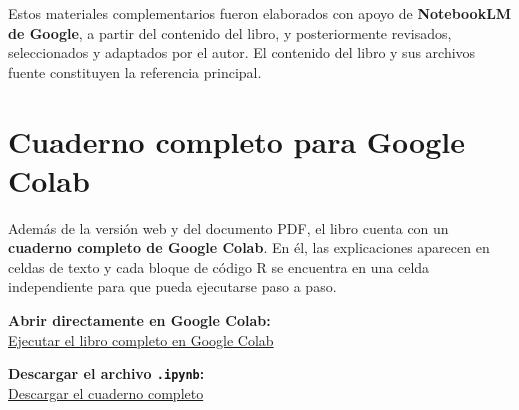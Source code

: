 \documentclass[
  spanish,
  10.5pt,
  letterpaper,
  openany,
  headings=big]{scrbook}
\begin{document}
\begin{tcolorbox}[enhanced jigsaw, arc=.35mm, bottomrule=.15mm, bottomtitle=1mm, breakable, colback=white, colbacktitle=quarto-callout-note-color!10!white, colframe=quarto-callout-note-color-frame, coltitle=black, left=2mm, leftrule=.75mm, opacityback=0, opacitybacktitle=0.6, rightrule=.15mm, title=\textcolor{quarto-callout-note-color}{\faInfo}\hspace{0.5em}{Elaboración de los recursos}, titlerule=0mm, toprule=.15mm, toptitle=1mm]

Estos materiales complementarios fueron elaborados con apoyo de
\textbf{NotebookLM de Google}, a partir del contenido del libro, y
posteriormente revisados, seleccionados y adaptados por el autor. El
contenido del libro y sus archivos fuente constituyen la referencia
principal.

\end{tcolorbox}


\chapter*{Cuaderno completo para Google
Colab}\label{cuaderno-completo-para-google-colab}


Además de la versión web y del documento PDF, el libro cuenta con un
\textbf{cuaderno completo de Google Colab}. En él, las explicaciones
aparecen en celdas de texto y cada bloque de código R se encuentra en
una celda independiente para que pueda ejecutarse paso a paso.

\begin{tcolorbox}[enhanced jigsaw, arc=.35mm, bottomrule=.15mm, bottomtitle=1mm, breakable, colback=white, colbacktitle=quarto-callout-tip-color!10!white, colframe=quarto-callout-tip-color-frame, coltitle=black, left=2mm, leftrule=.75mm, opacityback=0, opacitybacktitle=0.6, rightrule=.15mm, title=\textcolor{quarto-callout-tip-color}{\faLightbulb}\hspace{0.5em}{Abrir o descargar el cuaderno}, titlerule=0mm, toprule=.15mm, toptitle=1mm]

\textbf{Abrir directamente en Google Colab:}\\
\href{https://colab.research.google.com/github/gilbertorodriguez59/libro-machine-learning-r-dev/blob/main/Aprendizaje_y_Clasificacion_Automatica_con_R_Colab.ipynb}{Ejecutar
el libro completo en Google Colab}

\textbf{Descargar el archivo \texttt{.ipynb}:}\\
\href{Aprendizaje_y_Clasificacion_Automatica_con_R_Colab.ipynb}{Descargar
el cuaderno completo}

\end{tcolorbox}
\end{document}
